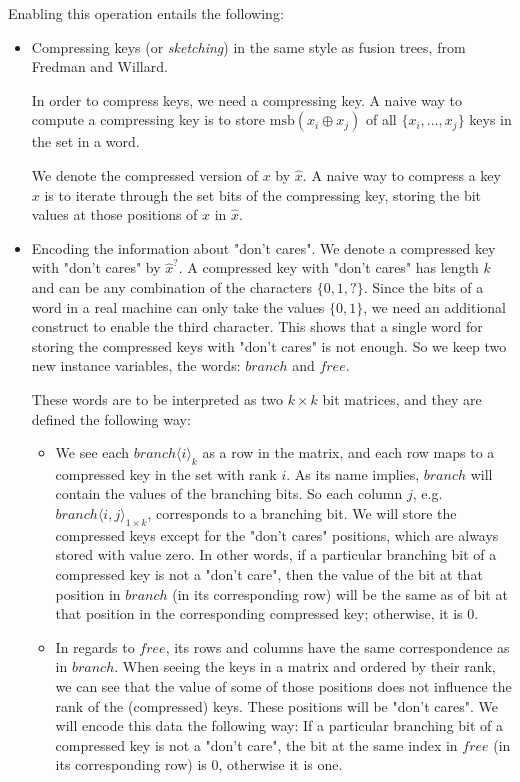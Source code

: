Enabling this operation entails the following:
\begin{itemize}
    \item
    Compressing keys (or \textit{sketching}) in the same style as fusion trees, from Fredman and Willard.
    
    In order to compress keys, we need a compressing key. A naive way to compute a compressing key is to store $\text{msb}(x_i \oplus x_j)$ of all $\{x_i, \dots, x_j\}$ keys in the set in a word.
    
    We denote the compressed version of $x$ by $\hat x $. A naive way to compress a key $x$ is to iterate through the set bits of the compressing key, storing the bit values at those positions of $x$ in $\hat x$.
    
    \item
    Encoding the information about "don't cares". We denote a compressed key with "don't cares" by $\hat x^?$. A compressed key with "don't cares" has length $k$ and can be any combination of the characters $\{0, 1, ?\}$. Since the bits of a word in a real machine can only take the values $\{0, 1\}$, we need an additional construct to enable the third character. This shows that a single word for storing the compressed keys with "don't cares" is not enough. So we keep two new instance variables, the words: $branch$ and $free$.
    
    These words are to be interpreted as two $k \times k$ bit matrices, and they are defined the following way:
    \begin{itemize}
        \item
        We see each $branch\langle i \rangle_k$ as a row in the matrix, and each row maps to a compressed key in the set with rank $i$.
        As its name implies, $branch$ will contain the values of the branching bits. 
        So each column $j$, e.g. $branch\langle i, j\rangle_{1 \times k}$, corresponds to a branching bit.
        We will store the compressed keys except for the "don't cares" positions, which are always stored with value zero.
        In other words, if a particular branching bit of a compressed key is not a "don't care", then the value of the bit at that position in $branch$ (in its corresponding row) will be the same as of bit at that position in the corresponding compressed key; otherwise, it is 0.
        
        \item
        In regards to $free$, its rows and columns have the same correspondence as in $branch$.
        When seeing the keys in a matrix and ordered by their rank, we can see that the value of some of those positions does not influence the rank of the (compressed) keys.
        These positions will be "don't cares".
        We will encode this data the following way: If a particular branching bit of a compressed key is not a "don't care", the bit at the same index in $free$ (in its corresponding row) is 0, otherwise it is one.
    \end{itemize}


\end{itemize}
